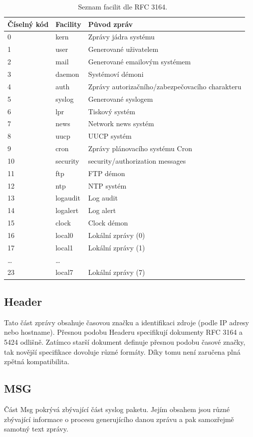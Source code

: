 \documentclass[thesis=B,czech]{FITthesis}[2012/06/26]
\begin{document}
\begin{table}[ht]   %
\centering
	\caption[Tabulka facilit podle RFC 3164]{Seznam facilit dle RFC 3164.~\cite{RFC3164}}
	\begin{tabular}{|l|l|l|}\hline
		Číselný kód & Facility & Původ zpráv \tabularnewline \hline \hline
		0		& kern & Zprávy jádra systému	\tabularnewline \hline
		1		& user & Generované uživatelem	\tabularnewline \hline
		2		& mail & Generované emailovým systémem			\tabularnewline \hline
		3		& daemon & Systémoví démoni			\tabularnewline \hline
		4		& auth & Zprávy autorizačního/zabezpečovacího charakteru		\tabularnewline \hline
		5		& syslog & Generované syslogem	\tabularnewline \hline
		6		& lpr & Tiskový systém		\tabularnewline \hline
		7		& news & Network news systém		\tabularnewline \hline
		8		& uucp & UUCP systém			\tabularnewline \hline
		9		& cron & Zprávy plánovacího systému Cron			\tabularnewline \hline
		10		& security & security/authorization messages			\tabularnewline \hline
		11		& ftp & FTP démon				\tabularnewline \hline
		12		& ntp & NTP systém			\tabularnewline \hline
		13		& logaudit & Log audit				\tabularnewline \hline
		14		& logalert & Log alert				\tabularnewline \hline
		15		& clock & Clock démon			\tabularnewline \hline
		16		& local0 & Lokální zprávy (0)			\tabularnewline \hline
		17		& local1 & Lokální zprávy (1)			\tabularnewline \hline
		\ldots	& \ldots				\tabularnewline \hline
		23		& local7 & Lokální zprávy (7)			\tabularnewline \hline
	\end{tabular}
\end{table}

\subsection{Header}
Tato část zprávy obsahuje časovou značku a identifikaci zdroje (podle IP adresy nebo hostname). Přesnou podobu Headeru specifikují dokumenty RFC 3164 a 5424 odlišně. Zatímco starší dokument definuje přesnou podobu časové značky, tak novější specifikace dovoluje různé formáty. Díky tomu není zaručena plná zpětná kompatibilita.

\subsection{MSG}
Část Msg pokrývá zbývající část syslog paketu. Jejím obsahem jsou různé zbývající informace o procesu generujícího danou zprávu a pak samozřejmě samotný text zprávy.
\end{document}
